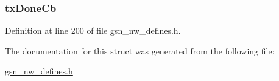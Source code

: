 \hypertarget{a00107_a324e49e4a2f3b96e1d133de0a806b580}{
\subsubsection[{txDoneCb}]{ {\bf txDoneCb}}}
\label{a00107_a324e49e4a2f3b96e1d133de0a806b580}


Definition at line 200 of file gsn\_\-nw\_\-defines.h.



The documentation for this struct was generated from the following file:\begin{DoxyCompactItemize}
\item 
\hyperlink{a00533}{gsn\_\-nw\_\-defines.h}\end{DoxyCompactItemize}
